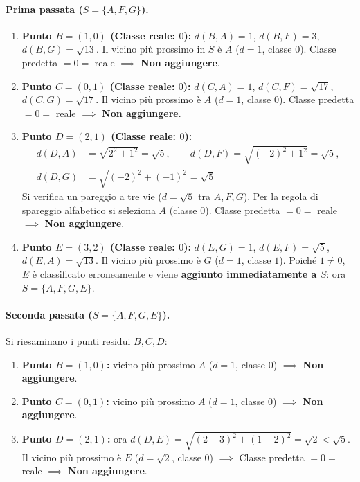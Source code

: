 \paragraph{Prima passata ($S = \{A, F, G\}$).}
\begin{enumerate}
    \item \textbf{Punto $B = (1, 0)$ (Classe reale: $0$):} $d(B, A) = 1$, $d(B, F) = 3$, $d(B, G) = \sqrt{13}$. Il vicino pi\`u prossimo in $S$ \`e $A$ ($d = 1$, classe $0$). Classe predetta $= 0 =$ reale $\implies$ \textbf{Non aggiungere}.
    \item \textbf{Punto $C = (0, 1)$ (Classe reale: $0$):} $d(C, A) = 1$, $d(C, F) = \sqrt{17}$, $d(C, G) = \sqrt{17}$. Il vicino pi\`u prossimo \`e $A$ ($d = 1$, classe $0$). Classe predetta $= 0 =$ reale $\implies$ \textbf{Non aggiungere}.
    \item \textbf{Punto $D = (2, 1)$ (Classe reale: $0$):}
    \begin{align*}
        d(D, A) &= \sqrt{2^2 + 1^2} = \sqrt{5}, \qquad
        d(D, F) = \sqrt{(-2)^2 + 1^2} = \sqrt{5}, \\
        d(D, G) &= \sqrt{(-2)^2 + (-1)^2} = \sqrt{5}
    \end{align*}
    Si verifica un pareggio a tre vie ($d = \sqrt{5}$ tra $A, F, G$). Per la regola di spareggio alfabetico si seleziona $A$ (classe $0$). Classe predetta $= 0 =$ reale $\implies$ \textbf{Non aggiungere}.
    \item \textbf{Punto $E = (3, 2)$ (Classe reale: $0$):} $d(E, G) = 1$, $d(E, F) = \sqrt{5}$, $d(E, A) = \sqrt{13}$. Il vicino pi\`u prossimo \`e $G$ ($d = 1$, classe $1$). Poich\'e $1 \neq 0$, $E$ \`e classificato erroneamente e viene \textbf{aggiunto immediatamente a $S$}: ora $S = \{A, F, G, E\}$.
\end{enumerate}

\paragraph{Seconda passata ($S = \{A, F, G, E\}$).}
Si riesaminano i punti residui $B, C, D$:
\begin{enumerate}
    \item \textbf{Punto $B = (1, 0)$:} vicino pi\`u prossimo $A$ ($d = 1$, classe $0$) $\implies$ \textbf{Non aggiungere}.
    \item \textbf{Punto $C = (0, 1)$:} vicino pi\`u prossimo $A$ ($d = 1$, classe $0$) $\implies$ \textbf{Non aggiungere}.
    \item \textbf{Punto $D = (2, 1)$:} ora $d(D, E) = \sqrt{(2-3)^2 + (1-2)^2} = \sqrt{2} < \sqrt{5}$. Il vicino pi\`u prossimo \`e $E$ ($d = \sqrt{2}$, classe $0$) $\implies$ Classe predetta $= 0 =$ reale $\implies$ \textbf{Non aggiungere}.
\end{enumerate}

